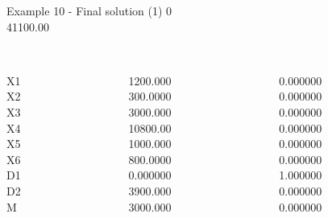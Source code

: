 \begin{frame}{Example 10 - Final solution (1)}
\footnotesize
{}  0\\
  41100.00\\

\begin{columns}[t]
\begin{column}{0.3\textwidth}
\\
X1\\
X2\\
X3\\
X4\\
X5\\
X6\\
D1\\
D2\\
M\\

\end{column}
\begin{column}{0.3\textwidth}
\\
1200.000\\
300.0000\\
3000.000\\
10800.00\\
1000.000\\
800.0000\\
0.000000\\
3900.000\\
3000.000\\

\end{column}

\begin{column}{0.3\textwidth}
\\
0.000000\\
0.000000\\
0.000000\\
0.000000\\
0.000000\\
0.000000\\
1.000000\\
0.000000\\
0.000000\\
\end{column}
\end{columns}
\end{frame}


